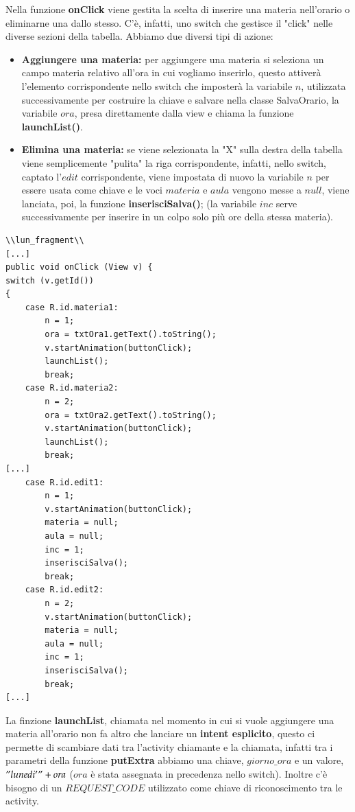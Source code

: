 \documentclass[a4paper, 50pt, twoside]{article}
\begin{document}
Nella funzione \textbf{onClick} viene gestita la scelta di inserire una materia nell'orario o eliminarne una dallo stesso. C'è, infatti, uno switch che gestisce il "click" nelle diverse sezioni della tabella. Abbiamo due diversi tipi di azione:
\begin{itemize}
\item \textbf{Aggiungere una materia:} per aggiungere una materia si seleziona un campo materia relativo all'ora in cui vogliamo inserirlo, questo attiverà l'elemento corrispondente nello switch che imposterà la variabile $n$, utilizzata successivamente per costruire la chiave e salvare nella classe SalvaOrario, la variabile $ora$, presa direttamente dalla view e chiama la funzione \textbf{launchList()}.
\item \textbf{Elimina una materia:} se viene selezionata la "X" sulla destra della tabella viene semplicemente "pulita" la riga corrispondente, infatti, nello switch, captato l'$edit$ corrispondente, viene impostata di nuovo la variabile $n$ per essere usata come chiave e le voci $materia$ e $aula$ vengono messe a $null$, viene lanciata, poi, la funzione \textbf{inserisciSalva()}; (la variabile $inc$ serve successivamente per inserire in un colpo solo più ore della stessa materia).
\end{itemize}
\newpage
\begin{lstlisting}
\\lun_fragment\\
[...]
public void onClick (View v) {
switch (v.getId())
{
	case R.id.materia1:
		n = 1;
		ora = txtOra1.getText().toString();
		v.startAnimation(buttonClick);
		launchList();
		break;
	case R.id.materia2:
		n = 2;
		ora = txtOra2.getText().toString();
		v.startAnimation(buttonClick);
		launchList();
		break;
[...]
	case R.id.edit1:
		n = 1;
		v.startAnimation(buttonClick);
		materia = null;
		aula = null;
		inc = 1;
		inserisciSalva();
		break;
	case R.id.edit2:
		n = 2;
		v.startAnimation(buttonClick);
		materia = null;
		aula = null;
		inc = 1;
		inserisciSalva();
		break;
[...]
\end{lstlisting}

La finzione \textbf{launchList}, chiamata nel momento in cui si vuole aggiungere una materia all'orario non fa altro che lanciare un \textbf{intent esplicito}, questo ci permette di scambiare dati tra l'activity chiamante e la chiamata, infatti tra i parametri della funzione \textbf{putExtra} abbiamo una chiave, $giorno\_ora$ e un valore, $"lunedi'" + ora$ ($ora$ è stata assegnata in precedenza nello switch). Inoltre c'è bisogno di un $REQUEST\_CODE$ utilizzato come chiave di riconoscimento tra le activity.
\end{document}
